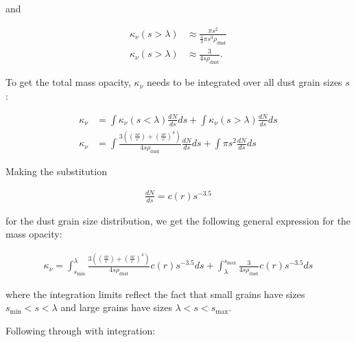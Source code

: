 \documentclass[12pt]{article}
\begin{document}
and 

\begin{equation*}
\begin{split}
\kappa_\nu(s>\lambda) &\approx \frac{\pi s^2}{\frac{4}{3}\pi s^3 \rho_\mathrm{dust}} \\
\kappa_\nu(s>\lambda) &\approx \frac{3}{4s\rho_\mathrm{dust}}.
\end{split}
\end{equation*}

To get the total mass opacity, $\kappa_\nu$ needs to be integrated over all dust grain sizes $s$:

\begin{equation*}
\begin{split}
\kappa_\nu &= \int\kappa_\nu(s<\lambda)\frac{dN}{ds}ds + \int\kappa_\nu(s>\lambda)\frac{dN}{ds}ds \\
\kappa_\nu &= \int \frac{3\left(\left(\frac{s\nu}{c}\right) + \left(\frac{s\nu}{c}\right)^4\right)}{4s \rho_\mathrm{dust}} \frac{dN}{ds}ds + \int \pi s^2 \frac{dN}{ds}ds
\end{split}
\end{equation*}

Making the substitution

\begin{align*}
\frac{dN}{ds} = c(r)s^{-3.5}
\end{align*}

for the dust grain size distribution, we get the following general expression for the mass opacity:

\begin{equation*}
\begin{split}
\kappa_\nu = \int_{s_\mathrm{min}}^\lambda \frac{3\left(\left(\frac{s\nu}{c}\right) + \left(\frac{s\nu}{c}\right)^4\right)}{4s \rho_\mathrm{dust}} c(r)s^{-3.5}ds + \int_\lambda^{s_\mathrm{max}} \frac{3}{4s\rho_\mathrm{dust}} c(r)s^{-3.5}ds
\end{split}
\end{equation*}

where the integration limits reflect the fact that small grains have sizes $s_\mathrm{min}<s<\lambda$ and large grains have sizes $\lambda<s<s_\mathrm{max}$.

Following through with integration:
\end{document}
